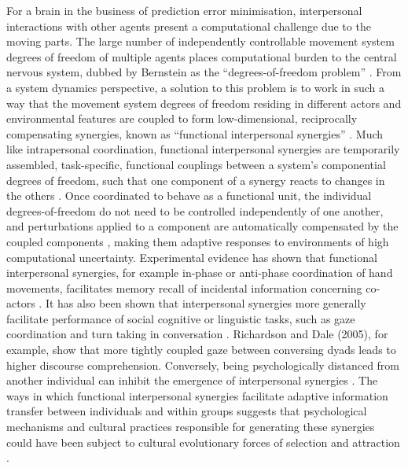 \begin{mccorrection}
For a brain in the business of prediction error minimisation, interpersonal interactions with other agents present a computational challenge due to the moving parts.  The large number of independently controllable movement system degrees of freedom of multiple agents places computational burden to the central nervous system, dubbed by Bernstein \textcite{Bernstein1967} as the ``degrees-of-freedom problem'' \citep[see also][]{Turvey1982,Turvey1990}.  From a system dynamics perspective, a solution to this problem is to work in such a way that the movement system degrees of freedom residing in different actors and environmental features are coupled to form low-dimensional, reciprocally compensating synergies, known as ``functional interpersonal synergies'' \citep{Riley2011}.
Much like intrapersonal coordination, functional interpersonal synergies are temporarily assembled, task-specific, functional couplings between a system's componential degrees of freedom, such that one component of a synergy reacts to changes in the others \citep{Kelso2009}.  Once coordinated to behave as a functional unit, the individual degrees-of-freedom do not need to be controlled independently of one another, and perturbations applied to a component are automatically compensated by the coupled components \citep{Kelso1984,Latash2002,Riley2011}, making them adaptive responses to environments of high computational uncertainty.
Experimental evidence has shown that functional interpersonal synergies, for example in-phase or anti-phase coordination of hand movements, facilitates memory recall of incidental information concerning co-actors \citep{Miles2010}. It has also been shown that interpersonal synergies more generally facilitate performance of social cognitive or linguistic tasks, such as gaze coordination and turn taking in conversation \citep{Richardson2005,Shockley2009}.  Richardson and Dale (2005), for example, show that more tightly coupled gaze between conversing dyads leads to higher discourse comprehension.  Conversely, being psychologically distanced from another individual can inhibit the emergence of interpersonal synergies \citep{Miles2010}.  The ways in which functional interpersonal synergies facilitate adaptive information transfer between individuals and within groups suggests that psychological mechanisms and cultural practices responsible for generating these synergies could have been subject to cultural evolutionary forces of selection and attraction \citep{Claidiere2014,Mesoudi2016a}.


\end{mccorrection}
